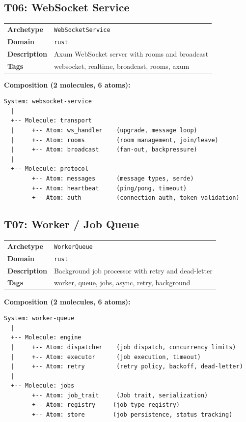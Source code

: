 \documentclass[11pt,a4paper,twoside]{article}
\theoremstyle{definition}
\theoremstyle{plain}
\theoremstyle{remark}
\begin{document}
\subsection{T06: WebSocket Service}\label{sec:t06}

\begin{tabularx}{\textwidth}{l X}
\toprule
\textbf{Archetype} & \texttt{WebSocketService} \\
\textbf{Domain} & \texttt{rust} \\
\textbf{Description} & Axum WebSocket server with rooms and broadcast \\
\textbf{Tags} & websocket, realtime, broadcast, rooms, axum \\
\bottomrule
\end{tabularx}

\medskip\noindent\textbf{Composition (2 molecules, 6 atoms):}

\begin{lstlisting}
System: websocket-service
  |
  +-- Molecule: transport
  |     +-- Atom: ws_handler    (upgrade, message loop)
  |     +-- Atom: rooms         (room management, join/leave)
  |     +-- Atom: broadcast     (fan-out, backpressure)
  |
  +-- Molecule: protocol
        +-- Atom: messages      (message types, serde)
        +-- Atom: heartbeat     (ping/pong, timeout)
        +-- Atom: auth          (connection auth, token validation)
\end{lstlisting}

\subsection{T07: Worker / Job Queue}\label{sec:t07}

\begin{tabularx}{\textwidth}{l X}
\toprule
\textbf{Archetype} & \texttt{WorkerQueue} \\
\textbf{Domain} & \texttt{rust} \\
\textbf{Description} & Background job processor with retry and dead-letter \\
\textbf{Tags} & worker, queue, jobs, async, retry, background \\
\bottomrule
\end{tabularx}

\medskip\noindent\textbf{Composition (2 molecules, 6 atoms):}

\begin{lstlisting}
System: worker-queue
  |
  +-- Molecule: engine
  |     +-- Atom: dispatcher    (job dispatch, concurrency limits)
  |     +-- Atom: executor      (job execution, timeout)
  |     +-- Atom: retry         (retry policy, backoff, dead-letter)
  |
  +-- Molecule: jobs
        +-- Atom: job_trait     (Job trait, serialization)
        +-- Atom: registry     (job type registry)
        +-- Atom: store        (job persistence, status tracking)
\end{lstlisting}
\end{document}
